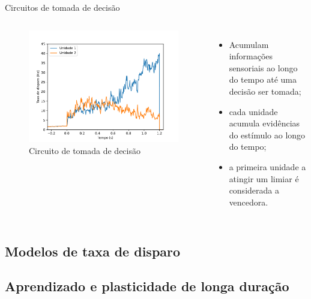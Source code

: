 \begin{frame}{Circuitos de tomada de decisão}
	\begin{columns}[t]
		\column{5cm}
			\begin{figure}[tb]
				\centering
				\caption{Circuito de tomada de decisão}
				\label{fig:tomadadecisao}
				\includegraphics[width=\linewidth]{figs/tomada_decisao}
			\end{figure}
		\column{5cm}
			\begin{itemize}
				\item Acumulam informações sensoriais ao longo do tempo até uma decisão ser tomada;
				\item cada unidade acumula evidências do estímulo ao longo do tempo;
				\item a primeira unidade a atingir um limiar é considerada a vencedora.
			\end{itemize}
	\end{columns}
\end{frame}

\subsection{Modelos de taxa de disparo}

\subsection{Aprendizado e plasticidade de longa duração}
